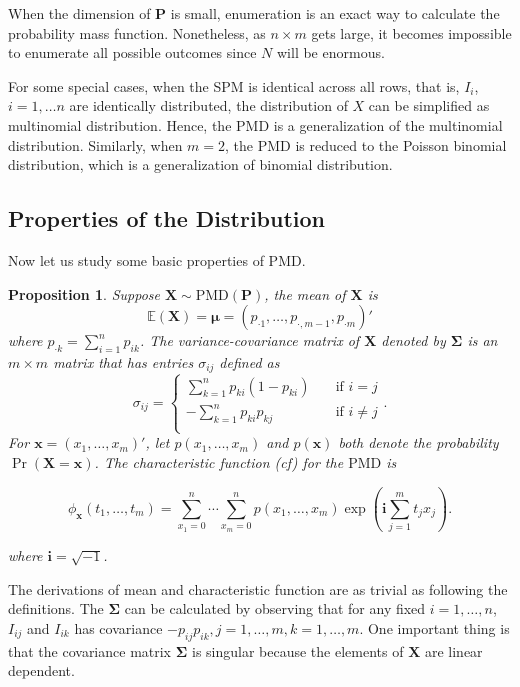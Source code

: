 \documentclass[12pt]{article}
\newcommand{\EE}{\mathbb{E}}
\newcommand{\Xmat}{\mathbf{X}}
\newcommand{\Pmat}{\mathbf{P}}
\newcommand{\ivec}{{\boldsymbol{i}}}
\newcommand{\PMD}{\textrm{PMD}}
\newcommand{\Xvec}{\boldsymbol{X}}
\newcommand{\xvec}{\boldsymbol{x}}
\newcommand{\muvec}{\boldsymbol{\mu}}
\newcommand{\Sig}{\boldsymbol{\Sigma}}
\newcommand{\qedw}{\hfill \ensuremath{\Box}}
\newtheorem{ppt}{Proposition}
\begin{document}
When the dimension of $\Pmat$ is small, enumeration is an exact way to calculate the probability mass function. Nonetheless, as $n \times m$ gets large, it becomes impossible to enumerate all possible outcomes since $N$ will be enormous.

For some special cases, when the SPM is identical across all rows, that is, $I_{i}$, $i = 1, \dots n$ are identically distributed, the distribution of $X$ can be simplified as multinomial distribution. Hence, the $\PMD$ is a generalization of the multinomial distribution. Similarly, when $m=2$, the $\PMD$ is reduced to the Poisson binomial distribution, which is a generalization of binomial distribution.


\subsection{Properties of the Distribution} \label{subsec:propty}
Now let us study some basic properties of $\PMD$.

\begin{ppt}%
Suppose $\Xmat \sim \PMD (\Pmat)$, the mean of $\Xmat$ is
   $$\EE(\Xmat) = \muvec = \left( p_{\cdot1} ,\dots,p_{\cdot,m-1},p_{\cdot m}\right)'$$ where $p_{\cdot k} = \sum_{i=1}^{n}p_{i k}$.
The variance-covariance matrix of $\Xvec$ denoted by $\Sig$ is an $m \times m$ matrix that has entries $\sigma_{ij}$ defined as
\begin{equation*}
   \sigma_{ij} =
           \begin{cases}
             \sum_{k=1}^{n}p_{ki}(1-p_{ki}) & \quad \text{if } i=j\\
             -\sum_{k=1}^{n}p_{ki}p_{kj} & \quad \text{if } i \neq j\\
           \end{cases}.
\end{equation*}
For $\xvec = (x_1, \dots, x_m)'$, let $p(x_1,\ldots,x_{m})$ and $p(\xvec)$ both denote the probability $\Pr \left(\Xvec = \xvec \right)$. The characteristic function (cf) for the $\PMD$ is

\begin{equation*}
\phi_{\xvec}(t_1, \dots, t_{m})  =  \sum_{x_1 = 0}^{n} \cdots \sum_{x_{m} = 0}^n p(x_1,\ldots,x_{m})\exp\left(\ivec\sum_{j=1}^{m}t_jx_j\right).
\end{equation*}

where  $\ivec=\sqrt{-1}$.
\end{ppt}
The derivations of mean and characteristic function are as trivial as following the definitions. The $\Sig$ can be calculated by observing that for any fixed $i=1,\dots,n$, $I_{ij}$ and $I_{ik}$ has covariance $-p_{ij}p_{ik},j=1,\dots,m,k=1,\dots,m$. One important thing is that the covariance matrix $\Sig$ is singular because the elements of $\Xvec$ are linear dependent.
\end{document}
